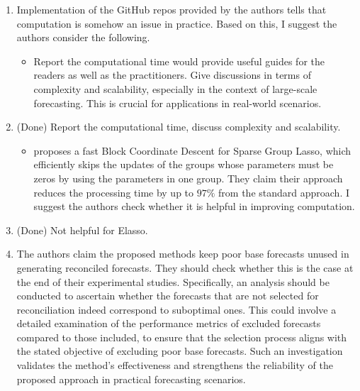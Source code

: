\documentclass[11pt,a4paper,]{article}
\providecommand{\tightlist}{%
  \setlength{\itemsep}{0pt}\setlength{\parskip}{0pt}}
\renewenvironment{quote}
               {\list{}{\rightmargin\leftmargin}%
                \item\relax\color[RGB]{0,150,0}}
               {\endlist}
\begin{document}
\begin{enumerate}
\def\labelenumi{\arabic{enumi}.}
\setcounter{enumi}{2}
\item
  Implementation of the GitHub repos provided by the authors tells that
  computation is somehow an issue in practice. Based on this, I suggest
  the authors consider the following.

  \begin{itemize}
  \tightlist
  \item
    Report the computational time would provide useful guides for the
    readers as well as the practitioners. Give discussions in terms of
    complexity and scalability, especially in the context of large-scale
    forecasting. This is crucial for applications in real-world
    scenarios.
  \end{itemize}

  \begin{quote}
  (Done) Report the computational time, discuss complexity and
  scalability.
  \end{quote}

  \begin{itemize}
  \tightlist
  \item
    \textcite{Ida2019-fa} proposes a fast Block Coordinate Descent for
    Sparse Group Lasso, which efficiently skips the updates of the
    groups whose parameters must be zeros by using the parameters in one
    group. They claim their approach reduces the processing time by up
    to \(97\%\) from the standard approach. I suggest the authors check
    whether it is helpful in improving computation.
  \end{itemize}

  \begin{quote}
  (Done) Not helpful for Elasso.
  \end{quote}
\item
  The authors claim the proposed methods keep poor base forecasts unused
  in generating reconciled forecasts. They should check whether this is
  the case at the end of their experimental studies. Specifically, an
  analysis should be conducted to ascertain whether the forecasts that
  are not selected for reconciliation indeed correspond to suboptimal
  ones. This could involve a detailed examination of the performance
  metrics of excluded forecasts compared to those included, to ensure
  that the selection process aligns with the stated objective of
  excluding poor base forecasts. Such an investigation validates the
  method's effectiveness and strengthens the reliability of the proposed
  approach in practical forecasting scenarios.
\end{enumerate}
\end{document}
